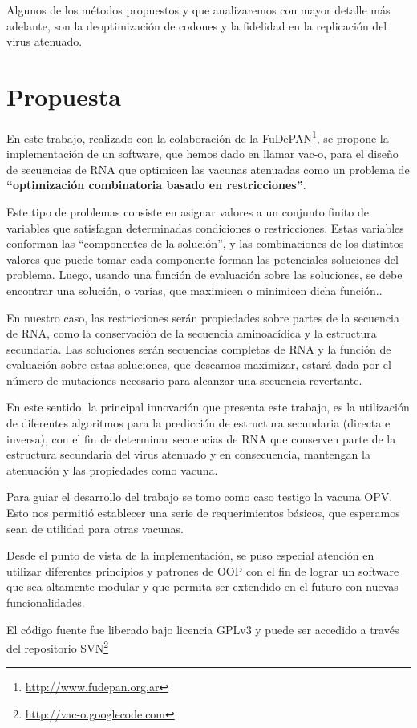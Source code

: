 Algunos de los m\'etodos propuestos y que analizaremos con mayor detalle m\'as
adelante, son la deoptimizaci\'on  de codones\cite{Coleman08} y la fidelidad en
la replicaci\'on del virus atenuado\cite{Vignuzzi08}.

\section{Propuesta}
\label{propuesta}
En este trabajo, realizado con la colaboraci\'on de la
\ac{FuDePAN}\footnote{\url{http://www.fudepan.org.ar}}, se propone la
implementaci\'on de un software, que hemos dado en llamar \ac{vac-o}, para el
dise\~no de secuencias de \ac{RNA} que optimicen las vacunas atenuadas como un
problema de \textbf{``optimizaci\'on combinatoria basado en restricciones''}. 

Este tipo de problemas consiste en asignar valores a un conjunto finito de
variables que satisfagan determinadas condiciones o restricciones. Estas
variables conforman las ``componentes de la soluci\'on'', y las combinaciones de
los distintos valores que puede tomar cada componente forman las potenciales
soluciones del problema. Luego, usando una funci\'on de evaluaci\'on sobre las
soluciones, se debe encontrar una soluci\'on, o varias, que maximicen o
minimicen dicha funci\'on.\cite{Hoos04}.

En nuestro caso, las restricciones ser\'an propiedades sobre partes de la
secuencia de \ac{RNA}, como la conservaci\'on de la secuencia aminoac\'idica y
la estructura secundaria. Las soluciones ser\'an secuencias completas de
\ac{RNA} y la funci\'on de evaluaci\'on sobre estas soluciones, que deseamos
maximizar, estar\'a dada por el n\'umero de mutaciones necesario para alcanzar
una secuencia revertante.

En este sentido, la principal innovaci\'on que presenta este trabajo, es la
utilizaci\'on de diferentes algoritmos para la predicci\'on de estructura
secundaria (directa e inversa), con el fin de determinar secuencias de
\ac{RNA} que conserven parte de la estructura secundaria del virus atenuado y
en consecuencia, mantengan la atenuaci\'on y las propiedades como vacuna.

Para guiar el desarrollo del trabajo se tomo como caso testigo la vacuna
\ac{OPV}. Esto nos permiti\'o establecer una serie de requerimientos b\'asicos,
que esperamos sean de utilidad para otras vacunas.

Desde el punto de vista de la implementaci\'on, se puso especial atenci\'on en
utilizar diferentes principios y patrones de \ac{OOP} con
el fin de lograr un software que sea altamente modular y que permita ser
extendido en el futuro con nuevas funcionalidades.

El c\'odigo fuente fue liberado bajo licencia \ac{GPLv3} y puede ser accedido a
trav\'es del repositorio \ac{SVN}\footnote{\url{http://vac-o.googlecode.com}}